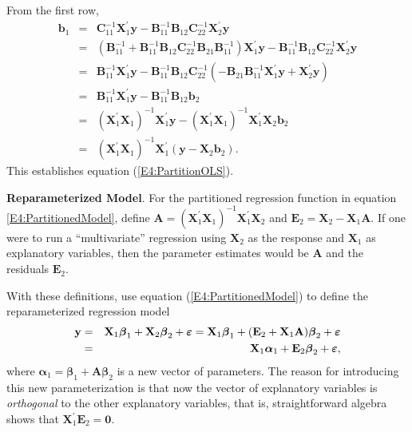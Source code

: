 From the first row,
\begin{eqnarray*}
\mathbf{b}_1 &=& \mathbf{C}_{11}^{-1}
\mathbf{X}_1^{\prime}\mathbf{y} -
\mathbf{B}_{11}^{-1}\mathbf{B}_{12}\mathbf{C}_{22}^{-1}
\mathbf{X}_2^{\prime}\mathbf{y} \\
&=& \left( \mathbf{B}_{11}^{-1} + \mathbf{B}_{11}^{-1}
\mathbf{B}_{12} \mathbf{C}_{22}^{-1} \mathbf{B}_{21}
\mathbf{B}_{11}^{-1} \right) \mathbf{X}_1^{\prime}\mathbf{y} -
\mathbf{B}_{11}^{-1}\mathbf{B}_{12}\mathbf{C}_{22}^{-1}
\mathbf{X}_2^{\prime}\mathbf{y} \\
&=& \mathbf{B}_{11}^{-1}\mathbf{X}_1^{\prime}\mathbf{y} -
\mathbf{B}_{11}^{-1} \mathbf{B}_{12} \mathbf{C}_{22}^{-1} \left(
-\mathbf{B}_{21} \mathbf{B}_{11}^{-1}
\mathbf{X}_1^{\prime}\mathbf{y} + \mathbf{X}_2^{\prime}\mathbf{y}
\right) \\
&=& \mathbf{B}_{11}^{-1}\mathbf{X}_1^{\prime}\mathbf{y} -
\mathbf{B}_{11}^{-1} \mathbf{B}_{12} \mathbf{b}_2\\
&=& (\mathbf{X}_1^{\prime}\mathbf{X}_1)^{-1}\mathbf{X}_1^{\prime}\mathbf{y} -
(\mathbf{X}_1^{\prime}\mathbf{X}_1)^{-1} \mathbf{X}_1^{\prime}\mathbf{X}_2 \mathbf{b}_2\\
&=& (\mathbf{X}_1^{\prime}\mathbf{X}_1)^{-1}\mathbf{X}_1^{\prime}
\left(
\mathbf{y} - \mathbf{X}_2 \mathbf{b}_2
\right) .
\end{eqnarray*}
This establishes equation (\ref{E4:PartitionOLS}).


\textbf{Reparameterized Model}. For the partitioned regression
function in equation \ref{E4:PartitionedModel}, define $\mathbf{A}=
\left( \mathbf{X}_1^{\prime} \mathbf{X}_1 \right)^{-1}
\mathbf{X}_1^{\prime} \mathbf{X}_2$ and $\mathbf{E}_2 = \mathbf{X}_2
- \mathbf{X}_1 \mathbf{A}$. If one were to run a ``multivariate''
regression using $\mathbf{X}_2$ as the response and $\mathbf{X}_1$
as explanatory variables, then the parameter estimates would be
$\mathbf{A}$ and the residuals $\mathbf{E}_2$.

With these definitions, use equation (\ref{E4:PartitionedModel}) to
define the reparameterized regression model
\begin{eqnarray}\label{E4:OVEquation}
\mathbf{y} &=& \mathbf{X}_1 \boldsymbol \beta _1 + \mathbf{X}_2
\boldsymbol \beta _2 + \boldsymbol \varepsilon = \mathbf{X}_1
\boldsymbol \beta _1 + (\mathbf{E}_2 + \mathbf{X}_1
\mathbf{A})\boldsymbol \beta _2 + \boldsymbol \varepsilon \notag \\
&=& \mathbf{X}_1 \boldsymbol \alpha _1 + \mathbf{E}_2 \boldsymbol
\beta _2 + \boldsymbol \varepsilon,
\end{eqnarray}
where $\boldsymbol \alpha _1 = \boldsymbol \beta _1 +
\mathbf{A}\boldsymbol \beta _2 $ is a new vector of parameters. The
reason for introducing this new parameterization is that now the
vector of explanatory variables is \textit{orthogonal} to the other
explanatory variables, that is, straightforward algebra shows that
$\mathbf{X}_1^{\prime }\mathbf{E}_2=\mathbf{0}$.


